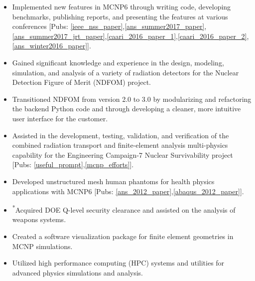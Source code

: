 \begin{center}
	\begin{minipage}{\textwidth}
	\begin{itemize}
	    \item Implemented new features in \textsc{MCNP6} through writing code, developing benchmarks, publishing reports, and presenting the features at various conferences [Pubs: \ref{ieee_nss_paper},\ref{ans_summer2017_paper},\ref{ans_summer2017_jrt_paper},\ref{caari_2016_paper_1},\ref{caari_2016_paper_2},\ref{ans_winter2016_paper}].
	    \item Gained significant knowledge and experience in the design, modeling, simulation, and analysis of a variety of radiation detectors for the Nuclear Detection Figure of Merit (NDFOM) project.
	    \item Transitioned NDFOM from version 2.0 to 3.0 by modularizing and refactoring the backend Python code and through developing a cleaner, more intuitive user interface for the customer.
	    \item Assisted in the development, testing, validation, and verification of the combined radiation transport and finite-element analysis multi-physics capability for the Engineering Campaign-7 Nuclear Survivability project [Pubs: \ref{useful_prompt},\ref{mcnp_efforts}].
	    \item Developed unstructured mesh human phantoms for health physics applications with \textsc{MCNP6} [Pubs: \ref{ans_2012_paper},\ref{abaqus_2012_paper}].
	    \item \textsuperscript{*}Acquired DOE Q-level security clearance and assisted on the analysis of weapons systems.
	    \item Created a software visualization package for finite element geometries in MCNP simulations.
	    \item Utilized high performance computing (HPC) systems and utilities for advanced physics simulations and analysis.

\end{itemize}
\end{minipage}
\end{center}
